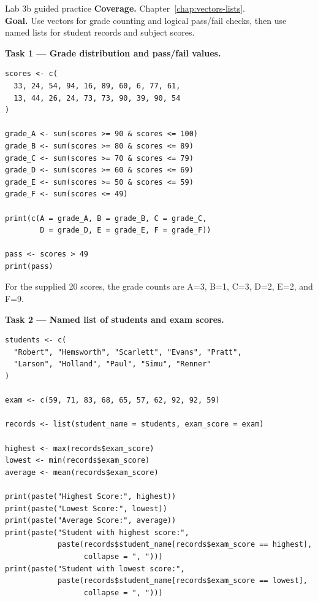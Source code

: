 
\begin{labproject}{Lab 3b guided practice}
\textbf{Coverage.} Chapter~\ref{chap:vectors-lists}.\\
\textbf{Goal.} Use vectors for grade counting and logical pass/fail checks, then use named lists for student records and subject scores.

\textbf{Task 1 --- Grade distribution and pass/fail values.}

\begin{lstlisting}[style=dsr]
scores <- c(
  33, 24, 54, 94, 16, 89, 60, 6, 77, 61,
  13, 44, 26, 24, 73, 73, 90, 39, 90, 54
)

grade_A <- sum(scores >= 90 & scores <= 100)
grade_B <- sum(scores >= 80 & scores <= 89)
grade_C <- sum(scores >= 70 & scores <= 79)
grade_D <- sum(scores >= 60 & scores <= 69)
grade_E <- sum(scores >= 50 & scores <= 59)
grade_F <- sum(scores <= 49)

print(c(A = grade_A, B = grade_B, C = grade_C,
        D = grade_D, E = grade_E, F = grade_F))

pass <- scores > 49
print(pass)
\end{lstlisting}

For the supplied 20 scores, the grade counts are A=3, B=1, C=3, D=2, E=2, and F=9.

\textbf{Task 2 --- Named list of students and exam scores.}

\begin{lstlisting}[style=dsr]
students <- c(
  "Robert", "Hemsworth", "Scarlett", "Evans", "Pratt",
  "Larson", "Holland", "Paul", "Simu", "Renner"
)

exam <- c(59, 71, 83, 68, 65, 57, 62, 92, 92, 59)

records <- list(student_name = students, exam_score = exam)

highest <- max(records$exam_score)
lowest <- min(records$exam_score)
average <- mean(records$exam_score)

print(paste("Highest Score:", highest))
print(paste("Lowest Score:", lowest))
print(paste("Average Score:", average))
print(paste("Student with highest score:",
            paste(records$student_name[records$exam_score == highest],
                  collapse = ", ")))
print(paste("Student with lowest score:",
            paste(records$student_name[records$exam_score == lowest],
                  collapse = ", ")))
\end{lstlisting}


\end{labproject}
